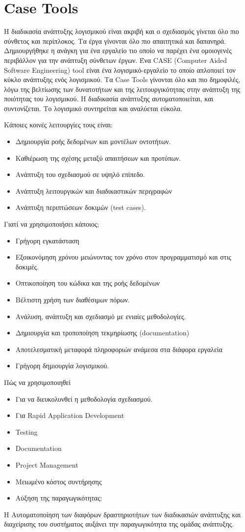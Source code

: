 \documentclass[oneside, 12pt]{book}
\begin{document}
	\chapter{Case Tools}
	Η διαδικασία ανάπτυξης λογισμικού είναι ακριβή και ο σχεδιασμός γίνεται όλο πιο σύνθετος και περίπλοκος. Τα έργα γίνονται όλο πιο απαιτητικά και δαπανηρά. Δημιουργήθηκε η ανάγκη για ένα εργαλείο τιο οποίο να παρέχει ένα ομοιογενές περιβάλλον για την ανάπτυξη σύνθετων έργων. 
	Ένα CASE (Computer Aided Software Engineering) tool είναι ένα λογισμικό-εργαλείο το οποίο απλοποιεί τον κύκλο ανάπτυξης ενός λογισμικού. Τα Case Tools γίνονται όλο και πιο δημοφιλές, λόγω της βελτίωσης των δυνατοτήτων και της λειτουργικότητας στην ανάπτυξη της ποιότητας του λογισμικού. Η διαδικασία ανάπτυξης αυτοματοποιείται, και συντονίζεται. Το λογισμικό συντηρείται και αναλύεται εύκολα. 
	
	Κάποιες κοινές λειτουργίες τους είναι:
	\begin{itemize}
	\item Δημιουργία ροής δεδομένων και μοντέλων οντοτήτων.
	\item Καθιέρωση της σχέσης μεταξύ απαιτήσεων και προτύπων.
	\item Ανάπτυξη του σχεδιασμού σε υψηλό επίπεδο.
	\item Ανάπτυξη λειτουργικών και διαδικαστικών περιγραφών
	\item Ανάπτυξη περιπτώσεων δοκιμών (test cases).	
	\end{itemize}
	
	Γιατί να χρησιμοποιήσει κάποιος;
	\begin{itemize}
	\item Γρήγορη εγκατάσταση
	\item Εξοικονόμηση χρόνου μειώνοντας τον χρόνο στον προγραμματισμό και στις δοκιμές.
	\item Οπτικοποίηση του κώδικα και της ροής δεδομένων
	\item Βέλτιστη χρήση των διαθέσιμων πόρων.
	\item Ανάλυση, ανάπτυξη και σχεδιασμό με ενιαίες μεθοδολογίες.
	\item Δημιουργία και τροποποίηση τεκμηρίωσης (documentation)
	\item Αποτελεσματική μεταφορά πληροφοριών ανάμεσα στα διάφορα εργαλεία
	\item Γρήγορη δημιουργία λογισμικού.
	\end{itemize}
	
	Πώς να χρησιμοποιηθεί
	\begin{itemize}
	\item Για να διευκολυνθεί η μεθοδολογία σχεδιασμού. 
	\item Για Rapid Application Development
	\item Testing
	\item Documentation
	\item Project Management
	\item Μειωμένο κόστος συντήρησης
	\item Αύξηση της παραγωγικότητας:
	\end{itemize}
	H Αυτοματοποίηση των διαφόρων δραστηριοτήτων των διαδικασιών ανάπτυξης και διαχείρισης του συστήματος αυξάνει την παραγωγικότητα της ομάδας ανάπτυξης.
	
\end{document}
